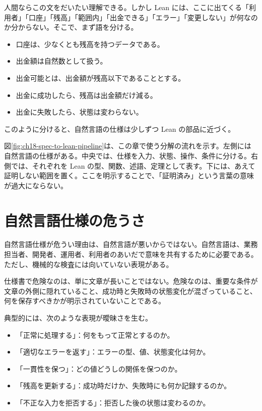 人間ならこの文をだいたい理解できる。しかし Lean には、ここに出てくる「利用者」「口座」「残高」「範囲内」「出金できる」「エラー」「変更しない」が何なのか分からない。そこで、まず語を分ける。

\begin{itemize}
\item 口座は、少なくとも残高を持つデータである。
\item 出金額は自然数として扱う。
\item 出金可能とは、出金額が残高以下であることとする。
\item 出金に成功したら、残高は出金額だけ減る。
\item 出金に失敗したら、状態は変わらない。
\end{itemize}

このように分けると、自然言語の仕様は少しずつ Lean の部品に近づく。


図\ref{fig:ch18-spec-to-lean-pipeline}は、この章で使う分解の流れを示す。左側には自然言語の仕様がある。中央では、仕様を入力、状態、操作、条件に分ける。右側では、それぞれを Lean の型、関数、述語、定理として表す。下には、あえて証明しない範囲を置く。ここを明示することで、「証明済み」という言葉の意味が過大にならない。

\section{自然言語仕様の危うさ}

自然言語仕様が危うい理由は、自然言語が悪いからではない。自然言語は、業務担当者、開発者、運用者、利用者のあいだで意味を共有するために必要である。ただし、機械的な検査には向いていない表現がある。

\begin{softwarebox}
仕様書で危険なのは、単に文章が長いことではない。危険なのは、重要な条件が文章の外側に隠れていること、成功時と失敗時の状態変化が混ざっていること、何を保存すべきかが明示されていないことである。
\end{softwarebox}

典型的には、次のような表現が曖昧さを生む。

\begin{itemize}
\item 「正常に処理する」：何をもって正常とするのか。
\item 「適切なエラーを返す」：エラーの型、値、状態変化は何か。
\item 「一貫性を保つ」：どの値どうしの関係を保つのか。
\item 「残高を更新する」：成功時だけか、失敗時にも何か記録するのか。
\item 「不正な入力を拒否する」：拒否した後の状態は変わるのか。
\end{itemize}

